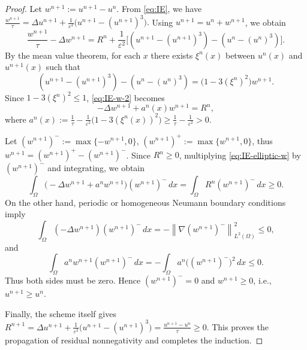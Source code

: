\documentclass[10pt,a4paper]{amsart}
\newcommand{\dt}{\tau}
\newcommand{\eps}{\varepsilon}
\begin{document}
\begin{proof}
Let \(w^{n+1}:=u^{n+1}-u^n\). From \eqref{eq:IE},
we have
$
 \frac{w^{n+1}}{\dt}=\Delta u^{n+1}+\frac{1}{\eps^2}\bigl(u^{n+1}-(u^{n+1})^3\bigr).
$
Using \(u^{n+1}=u^n+w^{n+1}\), we obtain
\begin{equation}
    \frac{w^{n+1}}{\dt}-\Delta w^{n+1}
    =R^n+\frac{1}{\eps^2}\bigl[(u^{n+1}-(u^{n+1})^3)-(u^n-(u^n)^3)\bigr].
    \label{eq:IE-w-2}
\end{equation}
By the mean value theorem, for each \(x\) there exists \(\xi^n(x)\) between \(u^n(x)\) and \(u^{n+1}(x)\) such that
\[
    (u^{n+1}-(u^{n+1})^3)-(u^n-(u^n)^3)
    =\bigl(1-3(\xi^n)^2\bigr)w^{n+1}.
\]
Since \(1-3(\xi^n)^2 \le1\), \eqref{eq:IE-w-2} becomes
\begin{equation}
    -\Delta w^{n+1}+a^n(x)w^{n+1}=R^n,
    \label{eq:IE-elliptic-w}
\end{equation}
where $ a^n(x):=\frac{1}{\dt}-\frac{1}{\eps^2}\bigl(1-3(\xi^n(x))^2\bigr)\ge
    \frac{1}{\dt}-\frac{1}{\eps^2}> 0.$

Let \((w^{n+1})^-:=\max\{-w^{n+1},0\}\), \((w^{n+1})^+:=\max\{w^{n+1},0\}\), thus
   $ w^{n+1}=(w^{n+1})^+-(w^{n+1})^-$.
Since \(R^n\ge0\), multiplying \eqref{eq:IE-elliptic-w} by \((w^{n+1})^-\) and integrating, we obtain
\[
    \int_\Omega\bigl(-\Delta w^{n+1}+a^n w^{n+1}\bigr)(w^{n+1})^-\,dx
    =
    \int_\Omega R^n(w^{n+1})^-\,dx\ge0.
\]
On the other hand, periodic or homogeneous Neumann boundary conditions imply
\[
    \int_\Omega (-\Delta w^{n+1})(w^{n+1})^-\,dx
    =-\left\|\nabla (w^{n+1})^-\right\|_{L^2(\Omega)}^2\le0,
\]
and
\[
    \int_\Omega a^n w^{n+1}(w^{n+1})^-\,dx
    =-\int_\Omega a^n\bigl((w^{n+1})^-\bigr)^2\,dx\le0.
\]
Thus both sides must be zero. Hence \((w^{n+1})^-=0\) and \(w^{n+1}\ge0\), i.e., \(u^{n+1}\ge u^n\).

Finally, the scheme itself gives
$
    R^{n+1}=\Delta u^{n+1}+\frac{1}{\eps^2}\bigl(u^{n+1}-(u^{n+1})^3\bigr)=\frac{u^{n+1}-u^n}{\dt}\ge0.
$
This proves the propagation of residual nonnegativity and completes the induction.
\end{proof}
\end{document}
